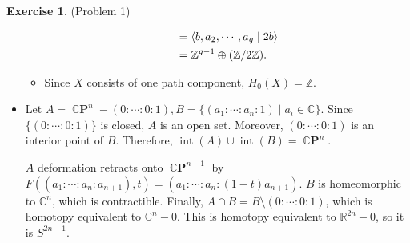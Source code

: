 \documentclass[psamsfonts]{amsart}
\theoremstyle{definition}
\newtheorem*{exer}{Exercise}
\theoremstyle{remark}
\DeclareMathOperator{\Int}{int}
\DeclareMathOperator{\CP}{\mathbb{C}\mathbf{P}}
\numberwithin{equation}{section}
\begin{document}
\begin{exer}{(Problem 1)}
\begin{itemize}
\begin{itemize}
\begin{align*}
               &= \ev{b, a_2, \cdots, a_g \mid 2b} \\
               &= \mathbb{Z}^{g - 1} \oplus (\mathbb{Z}/2\mathbb{Z}).
           \end{align*}
         \item
           Since $X$ consists of one path component, $H_0(X) = \mathbb{Z}$.
       \end{itemize}
     \item
       Let $A = \CP^n - (0: \cdots : 0:1), B = \{ (a_1: \cdots : a_n:1) \mid a_i \in \mathbb{C} \}$.
       Since $\{ (0: \cdots :0:1) \}$ is closed, $A$ is an open set.
       Moreover, $(0: \cdots :0:1)$ is an interior point of $B$.
       Therefore, $\Int(A) \cup \Int(B) = \CP^n$.

       $A$ deformation retracts onto $\CP^{n - 1}$ by $F((a_1:\cdots :a_n:a_{n + 1}), t) = (a_1:\cdots : a_n:(1 - t)a_{n + 1})$.
       $B$ is homeomorphic to $\mathbb{C}^n$, which is contractible.
       Finally, $A \cap B = B \setminus (0 : \cdots : 0 : 1)$, which is homotopy equivalent to $\mathbb{C}^{n} - 0$.
       This is homotopy equivalent to $\mathbb{R}^{2n} - 0$, so it is $S^{2n - 1}$.


\end{itemize}
\end{exer}
\end{document}
